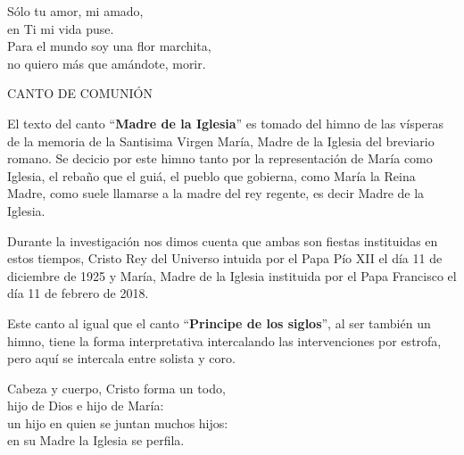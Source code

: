 \documentclass[12pt, letterpaper]{report}
\begin{document}
    \noindent
    S\'olo tu amor, mi amado,\\
    en Ti mi vida puse.\\
    Para el mundo soy una flor marchita,\\
    no quiero m\'as que am\'andote, morir.
    \clearpage




    \begin{center}
      {\large CANTO DE COMUNI\'ON}
    \end{center}

    El texto del canto ``\textbf{Madre de la Iglesia}'' es tomado del himno de las v\'isperas de la memoria de la Santisima Virgen Mar\'ia, Madre de la Iglesia del breviario romano. Se decicio por este himno tanto por la representaci\'on de Mar\'ia como Iglesia, el reba\~no que el gui\'a, el pueblo que gobierna, como Mar\'ia la Reina Madre, como suele llamarse a la madre del rey regente, es decir Madre de la Iglesia.

    Durante la investigaci\'on nos dimos cuenta que ambas son fiestas instituidas en estos tiempos, Cristo Rey del Universo intuida por el Papa P\'io XII el d\'ia 11 de diciembre de 1925 y Mar\'ia, Madre de la Iglesia instituida por el Papa Francisco el d\'ia 11 de febrero de 2018.

    Este canto al igual que el canto ``\textbf{Principe de los siglos}'', al ser tambi\'en un himno, tiene la forma interpretativa intercalando las intervenciones por estrofa, pero aqu\'i se intercala entre solista y coro.

    \noindent
    Cabeza y cuerpo, Cristo forma un todo,\\
    hijo de Dios e hijo de Mar\'ia:\\
    un hijo en quien se juntan muchos hijos:\\
    en su Madre la Iglesia se perfila.
\end{document}
